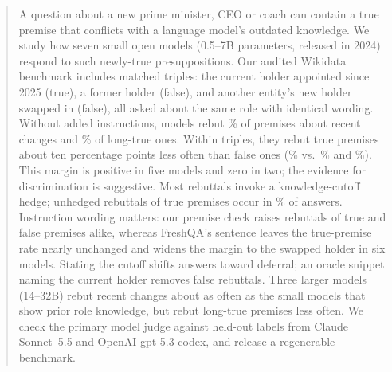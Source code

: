 \begin{abstract}
A question about a new prime minister, CEO or coach can contain a true premise that conflicts with a language model's outdated knowledge. We study how seven small open models (0.5--7B parameters, released in 2024) respond to such newly-true presuppositions. Our audited Wikidata benchmark includes matched triples: the current holder appointed since 2025 (true), a former holder (false), and another entity's new holder swapped in (false), all asked about the same role with identical wording. Without added instructions, models rebut \WGNewPlain\% of premises about recent changes and \WGOldPlain\% of long-true ones. Within triples, they rebut true premises about ten percentage points less often than false ones (\WNPlain\% vs.\ \WAPlain\% and \WSPlain\%). This margin is positive in five models and zero in two; the evidence for discrimination is suggestive. Most rebuttals invoke a knowledge-cutoff hedge; unhedged rebuttals of true premises occur in \WUhN\% of answers. Instruction wording matters: our premise check raises rebuttals of true and false premises alike, whereas FreshQA's sentence leaves the true-premise rate nearly unchanged and widens the margin to the swapped holder in six models. Stating the cutoff shifts answers toward deferral; an oracle snippet naming the current holder removes false rebuttals. Three larger models (14--32B) rebut recent changes about as often as the small models that show prior role knowledge, but rebut long-true premises less often. We check the primary model judge against held-out labels from Claude Sonnet~5.5 and OpenAI gpt-5.3-codex, and release a regenerable benchmark.
\end{abstract}
